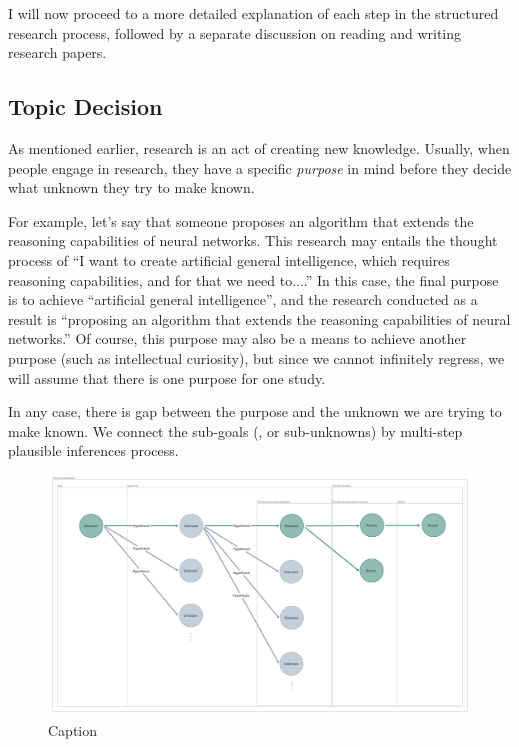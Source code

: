 \documentclass{book}
\begin{document}
I will now proceed to a more detailed explanation of each step in the structured research process, followed by a separate discussion on reading and writing research papers.

\subsection{Topic Decision}
As mentioned earlier, research is an act of creating new knowledge. Usually, when people engage in research, they have a specific \textit{purpose} in mind before they decide what unknown they try to make known.

For example, let's say that someone proposes an algorithm that extends the reasoning capabilities of neural networks. This research may entails the thought process of ``I want to create artificial general intelligence, which requires reasoning capabilities, and for that we need to....'' In this case, the final purpose is to achieve ``artificial general intelligence'', and the research conducted as a result is ``proposing an algorithm that extends the reasoning capabilities of neural networks.'' Of course, this purpose may also be a means to achieve another purpose (such as intellectual curiosity), but since we cannot infinitely regress, we will assume that there is one purpose for one study.

In any case, there is gap between the purpose and the unknown we are trying to make known. We connect the sub-goals (, or sub-unknowns) by multi-step plausible inferences process.

\begin{figure}[htb]
    \centering
    \includegraphics[width=\textwidth]{figs/unknown_tree.jpeg}
    \caption{Caption}
    \label{fig:unknown_tree}
\end{figure}
\end{document}

